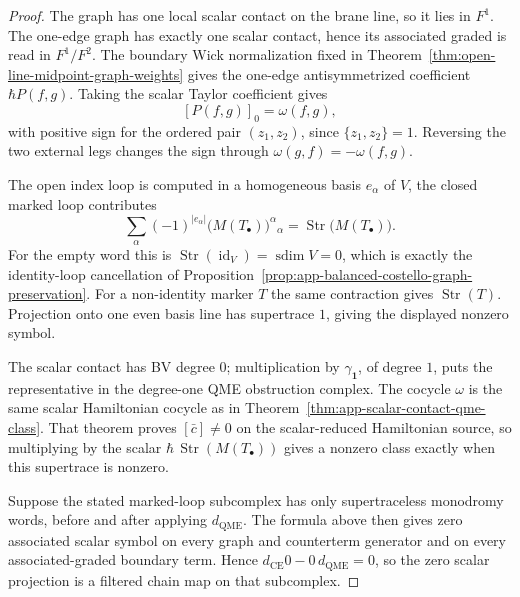 \begin{proof}
  The graph has one local scalar contact on the brane line, so it lies in
  \(F^1\).  The one-edge graph has exactly one scalar contact, hence its
  associated graded is read in \(F^1/F^2\).  The boundary Wick
  normalization fixed in
  Theorem~\ref{thm:open-line-midpoint-graph-weights} gives the one-edge
  antisymmetrized coefficient \(\hbar P(f,g)\).  Taking the scalar
  Taylor coefficient gives
  \[
    [P(f,g)]_0=\omega(f,g),
  \]
  with positive sign for the ordered pair \((z_1,z_2)\), since
  \(\{z_1,z_2\}=1\).  Reversing the two external legs changes the sign
  through \(\omega(g,f)=-\omega(f,g)\).

  The open index loop is computed in a homogeneous basis
  \(e_\alpha\) of \(V\), the closed marked loop contributes
  \[
    \sum_\alpha (-1)^{|e_\alpha|}
      \bigl(M(T_\bullet)\bigr)^\alpha{}_\alpha
      =
    \operatorname{Str}\!\bigl(M(T_\bullet)\bigr).
  \]
  For the empty word this is
  \(\operatorname{Str}(\operatorname{id}_V)=\operatorname{sdim}V=0\),
  which is exactly the identity-loop cancellation of
  Proposition~\ref{prop:app-balanced-costello-graph-preservation}.  For a
  non-identity marker \(T\) the same contraction gives
  \(\operatorname{Str}(T)\).  Projection onto one even basis line has
  supertrace \(1\), giving the displayed nonzero symbol.

  The scalar contact has BV degree \(0\); multiplication by
  \(\gamma_{\mathbf 1}\), of degree \(1\), puts the representative in the
  degree-one QME obstruction complex.  The cocycle \(\omega\) is the same
  scalar Hamiltonian cocycle as in
  Theorem~\ref{thm:app-scalar-contact-qme-class}.  That theorem proves
  \([\bar c]\neq0\) on the scalar-reduced Hamiltonian source, so multiplying
  by the scalar
  \(\hbar\,\operatorname{Str}(M(T_\bullet))\) gives a nonzero class
  exactly when this supertrace is nonzero.

  Suppose the stated marked-loop subcomplex has only supertraceless
  monodromy words, before and after applying \(d_{\mathrm{QME}}\).
  The formula above then gives zero associated scalar symbol on every
  graph and counterterm generator and on every associated-graded
  boundary term.  Hence
  \(d_{\mathrm{CE}}0-0\,d_{\mathrm{QME}}=0\), so the zero scalar
  projection is a filtered chain map on that subcomplex.
\end{proof}

